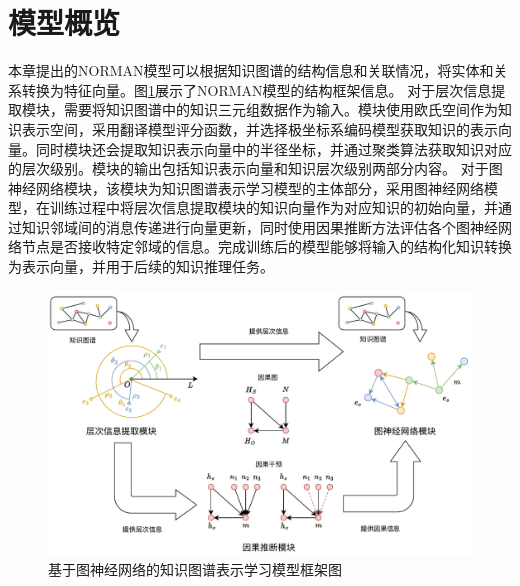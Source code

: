 \documentclass[algorithmlist, AutoFakeBold, AutoFakeSlant, figurelist, tablelist, nomlist, engineering]{seuthesix}
\begin{document}
\section{模型概览}
本章提出的NORMAN模型可以根据知识图谱的结构信息和关联情况，将实体和关系转换为特征向量。图\ref{2_NORMAN}展示了NORMAN模型的结构框架信息。
对于层次信息提取模块，需要将知识图谱中的知识三元组数据作为输入。模块使用欧氏空间作为知识表示空间，采用翻译模型评分函数，并选择极坐标系编码模型获取知识的表示向量。同时模块还会提取知识表示向量中的半径坐标，并通过聚类算法获取知识对应的层次级别。模块的输出包括知识表示向量和知识层次级别两部分内容。
对于图神经网络模块，该模块为知识图谱表示学习模型的主体部分，采用图神经网络模型，在训练过程中将层次信息提取模块的知识向量作为对应知识的初始向量，并通过知识邻域间的消息传递进行向量更新，同时使用因果推断方法评估各个图神经网络节点是否接收特定邻域的信息。完成训练后的模型能够将输入的结构化知识转换为表示向量，并用于后续的知识推理任务。
\begin{figure}[H]
  \centering
  \includegraphics[width=1.0\textwidth]{2_NORMAN}
  \caption{基于图神经网络的知识图谱表示学习模型框架图}
  \label{2_NORMAN}
\end{figure}
\end{document}
